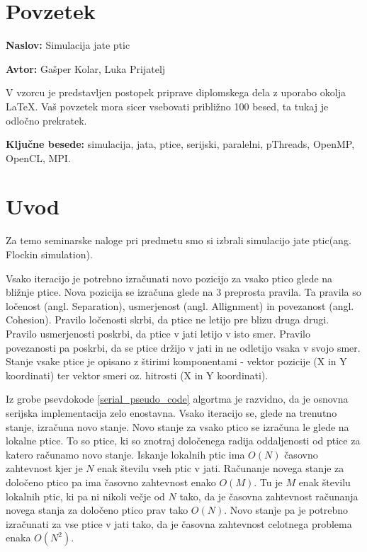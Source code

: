 \documentclass[a4paper, 12pt]{book}
\newcommand{\ttitle}{Simulacija jate ptic}
\newcommand{\tauthor}{Gašper Kolar, Luka Prijatelj}
\newcommand{\tkeywords}{simulacija, jata, ptice, serijski, paralelni, pThreads, OpenMP, OpenCL, MPI}
\newcommand{\clearemptydoublepage}{\newpage{\pagestyle{empty}\cleardoublepage}}
\begin{document}
\clearemptydoublepage

\chapter*{Povzetek}

\noindent\textbf{Naslov:} \ttitle
\bigskip

\noindent\textbf{Avtor:} \tauthor
\bigskip

\noindent V vzorcu je predstavljen postopek priprave diplomskega dela z uporabo okolja \LaTeX. Vaš povzetek mora sicer vsebovati približno 100 besed, ta tukaj je odločno prekratek.
\bigskip

\noindent\textbf{Ključne besede:} \tkeywords.
\clearemptydoublepage


\mainmatter
\setcounter{page}{1}
\pagestyle{fancy}

\chapter{Uvod}
Za temo seminarske naloge pri predmetu smo si izbrali simulacijo jate ptic(ang. Flockin simulation).

Vsako iteracijo je potrebno izračunati novo pozicijo za vsako ptico glede na bližnje ptice. Nova pozicija se izračuna glede na 3 preprosta pravila. Ta pravila so ločenost (angl. Separation), usmerjenost (angl. Allignment) in povezanost (angl. Cohesion). Pravilo ločenosti skrbi, da ptice ne letijo pre blizu druga drugi. Pravilo usmerjenosti poskrbi, da ptice v jati letijo v isto smer. Pravilo povezanosti pa poskrbi, da se ptice držijo v jati in ne odletijo vsaka v svojo smer. Stanje vsake ptice je opisano z štirimi komponentami - vektor pozicije (X in Y koordinati) ter vektor smeri oz. hitrosti (X in Y koordinati). 

Iz grobe psevdokode \ref{serial_pseudo_code} algortma je razvidno, da je osnovna serijska implementacija zelo enostavna. Vsako iteracijo se, glede na trenutno stanje, izračuna novo stanje. Novo stanje za vsako ptico se izračuna le glede na lokalne ptice. To so ptice, ki so znotraj določenega radija oddaljenosti od ptice za katero računamo novo stanje. Iskanje lokalnih ptic ima $O(N)$ časovno zahtevnost kjer je $N$ enak številu vseh ptic v jati. Računanje novega stanje za določeno ptico pa ima časovno zahtevnost enako $O(M)$. Tu je $M$ enak številu lokalnih ptic, ki pa ni nikoli večje od $N$ tako, da je časovna zahtevnost računanja novega stanja za določeno ptico prav tako $O(N)$. Novo stanje pa je potrebno izračunati za vse ptice v jati tako, da je časovna zahtevnost celotnega problema enaka $O(N^2)$. 
\end{document}
